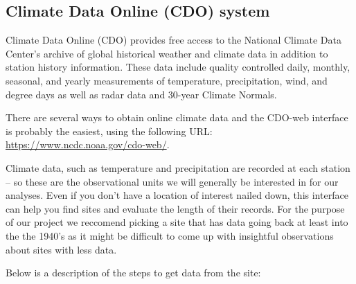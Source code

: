 \documentclass{article}\usepackage[]{graphicx}\usepackage[]{color}
\begin{document}
\subsection{Climate Data Online (CDO) system}

Climate Data Online (CDO) provides free access to the National Climate Data Center's archive of global historical weather and climate data in addition to station history information. These data include quality controlled daily, monthly, seasonal, and yearly measurements of temperature, precipitation, wind, and degree days as well as radar data and 30-year Climate Normals. 

There are several ways to obtain online climate data and the CDO-web interface is probably the easiest, using the following URL: \url{https://www.ncdc.noaa.gov/cdo-web/}. 

Climate data, such as temperature and precipitation are recorded at each station -- so these are the observational units we will generally be interested in for our analyses. Even if you don't have a location of interest nailed down, this interface can help you find sites and evaluate the length of their records. For the purpose of our project we reccomend picking a site that has data going back at least into the the 1940's as it might be difficult to come up with insightful observations about sites with less data. 

Below is a description of the steps to get data from the site:
\end{document}
